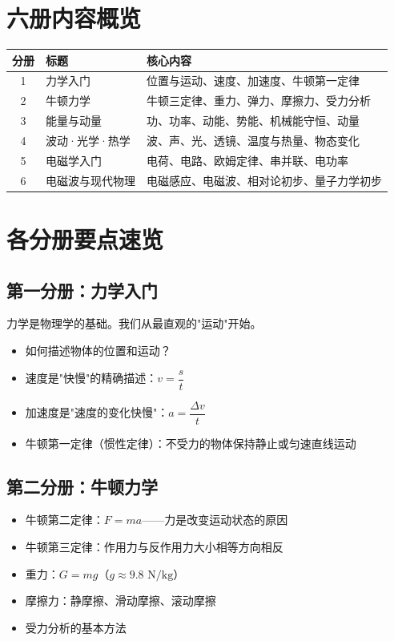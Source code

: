 \documentclass[a4paper,12pt]{ctexart}
\begin{document}
\newpage

\section*{\textcolor{defblue}{六册内容概览}}

\vspace{0.3cm}
\begin{center}
\begin{tabular}{|c|l|l|}
\hline
\textbf{分册} & \textbf{标题} & \textbf{核心内容} \\ \hline
1 & 力学入门 & 位置与运动、速度、加速度、牛顿第一定律 \\
2 & 牛顿力学 & 牛顿三定律、重力、弹力、摩擦力、受力分析 \\
3 & 能量与动量 & 功、功率、动能、势能、机械能守恒、动量 \\
4 & 波动·光学·热学 & 波、声、光、透镜、温度与热量、物态变化 \\
5 & 电磁学入门 & 电荷、电路、欧姆定律、串并联、电功率 \\
6 & 电磁波与现代物理 & 电磁感应、电磁波、相对论初步、量子力学初步 \\
\hline
\end{tabular}
\end{center}

\vspace{0.5cm}

\section*{\textcolor{defblue}{各分册要点速览}}

\subsection*{\textcolor{thinkorange}{第一分册：力学入门}}
力学是物理学的基础。我们从最直观的"运动"开始。
\begin{itemize}
  \item 如何描述物体的位置和运动？
  \item 速度是"快慢"的精确描述：$v = \dfrac{s}{t}$
  \item 加速度是"速度的变化快慢"：$a = \dfrac{\Delta v}{t}$
  \item 牛顿第一定律（惯性定律）：不受力的物体保持静止或匀速直线运动
\end{itemize}

\subsection*{\textcolor{thinkorange}{第二分册：牛顿力学}}
\begin{itemize}
  \item 牛顿第二定律：$F = ma$——力是改变运动状态的原因
  \item 牛顿第三定律：作用力与反作用力大小相等方向相反
  \item 重力：$G = mg$（$g \approx 9.8\text{ N/kg}$）
  \item 摩擦力：静摩擦、滑动摩擦、滚动摩擦
  \item 受力分析的基本方法
\end{itemize}
\end{document}
